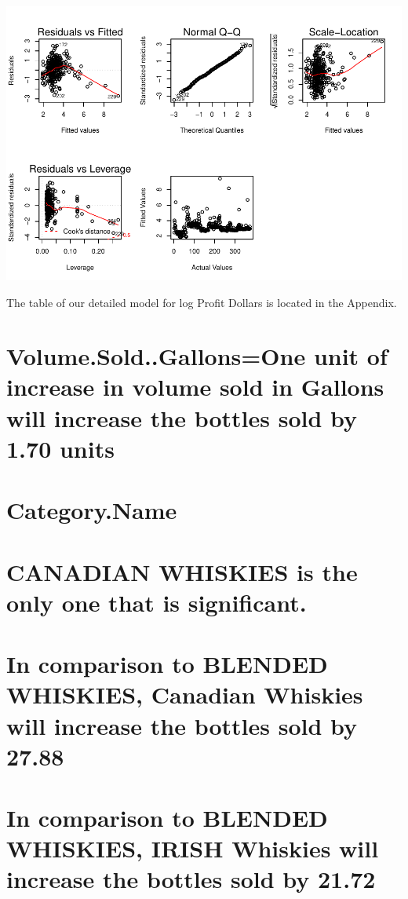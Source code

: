 \documentclass[]{elsarticle} %
\makeatletter
\def\maxwidth{\ifdim\Gin@nat@width>\linewidth\linewidth
\else\Gin@nat@width\fi}
\let\Oldincludegraphics\includegraphics
\renewcommand{\includegraphics}[1]{\Oldincludegraphics[width=\maxwidth]{#1}}
\makeatother
\begin{document}
\includegraphics{Final_Project_files/figure-latex/unnamed-chunk-22-1.pdf}

The table of our detailed model for log Profit Dollars is located in the
Appendix.

\section{Volume.Sold..Gallons=One unit of increase in volume sold in
Gallons will increase the bottles sold by 1.70
units}\label{volume.sold..gallonsone-unit-of-increase-in-volume-sold-in-gallons-will-increase-the-bottles-sold-by-1.70-units}

\section{Category.Name}\label{category.name}

\section{CANADIAN WHISKIES is the only one that is
significant.}\label{canadian-whiskies-is-the-only-one-that-is-significant.}

\section{In comparison to BLENDED WHISKIES, Canadian Whiskies will
increase the bottles sold by
27.88}\label{in-comparison-to-blended-whiskies-canadian-whiskies-will-increase-the-bottles-sold-by-27.88}

\section{In comparison to BLENDED WHISKIES, IRISH Whiskies will increase
the bottles sold by
21.72}\label{in-comparison-to-blended-whiskies-irish-whiskies-will-increase-the-bottles-sold-by-21.72}
\end{document}
